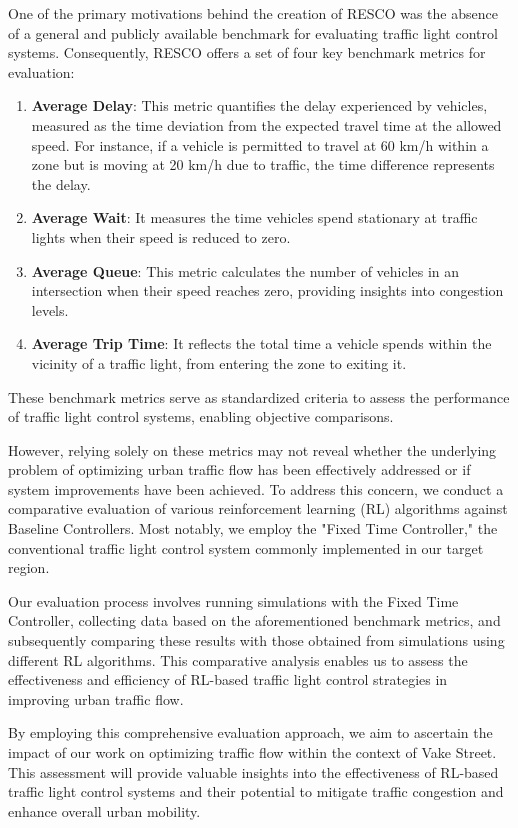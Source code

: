 One of the primary motivations behind the creation of RESCO was the absence of a general and publicly available benchmark for evaluating traffic light control systems. Consequently, RESCO offers a set of four key benchmark metrics for evaluation:

\begin{enumerate}
    \item \textbf{Average Delay}: This metric quantifies the delay experienced by vehicles, measured as the time deviation from the expected travel time at the allowed speed. For instance, if a vehicle is permitted to travel at 60 km/h within a zone but is moving at 20 km/h due to traffic, the time difference represents the delay.
    
    \item \textbf{Average Wait}: It measures the time vehicles spend stationary at traffic lights when their speed is reduced to zero.
    
    \item \textbf{Average Queue}: This metric calculates the number of vehicles in an intersection when their speed reaches zero, providing insights into congestion levels.
    
    \item \textbf{Average Trip Time}: It reflects the total time a vehicle spends within the vicinity of a traffic light, from entering the zone to exiting it.
\end{enumerate}

These benchmark metrics serve as standardized criteria to assess the performance of traffic light control systems, enabling objective comparisons.

However, relying solely on these metrics may not reveal whether the underlying problem of optimizing urban traffic flow has been effectively addressed or if system improvements have been achieved. To address this concern, we conduct a comparative evaluation of various reinforcement learning (RL) algorithms against Baseline Controllers. Most notably, we employ the "Fixed Time Controller," the conventional traffic light control system commonly implemented in our target region. 

Our evaluation process involves running simulations with the Fixed Time Controller, collecting data based on the aforementioned benchmark metrics, and subsequently comparing these results with those obtained from simulations using different RL algorithms. This comparative analysis enables us to assess the effectiveness and efficiency of RL-based traffic light control strategies in improving urban traffic flow.

By employing this comprehensive evaluation approach, we aim to ascertain the impact of our work on optimizing traffic flow within the context of Vake Street. This assessment will provide valuable insights into the effectiveness of RL-based traffic light control systems and their potential to mitigate traffic congestion and enhance overall urban mobility.
